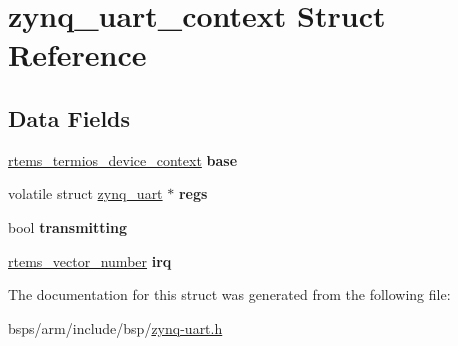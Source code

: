 \hypertarget{structzynq__uart__context}{}\section{zynq\+\_\+uart\+\_\+context Struct Reference}
\label{structzynq__uart__context}
\subsection*{Data Fields}
\begin{DoxyCompactItemize}
\item 
\mbox{\label{structzynq__uart__context_acd50653574838b140de35aad9f445dd7}} 
\mbox{\hyperlink{structrtems__termios__device__context}{rtems\+\_\+termios\+\_\+device\+\_\+context}} {\bfseries base}
\item 
\mbox{\label{structzynq__uart__context_a82113dd8ad2b0a608690f5d7d36d1ed0}} 
volatile struct \mbox{\hyperlink{structzynq__uart}{zynq\+\_\+uart}} $\ast$ {\bfseries regs}
\item 
\mbox{\label{structzynq__uart__context_a734443edbd0172e1c19fd46597a1e6ce}} 
bool {\bfseries transmitting}
\item 
\mbox{\label{structzynq__uart__context_ad28b0ad419fa6e93fd36202f046db024}} 
\mbox{\hyperlink{group__ClassicINTR_ga3e434c197d99f128e78cae4d9358bd8b}{rtems\+\_\+vector\+\_\+number}} {\bfseries irq}
\end{DoxyCompactItemize}


The documentation for this struct was generated from the following file\+:\begin{DoxyCompactItemize}
\item 
bsps/arm/include/bsp/\mbox{\hyperlink{zynq-uart_8h}{zynq-\/uart.\+h}}\end{DoxyCompactItemize}
